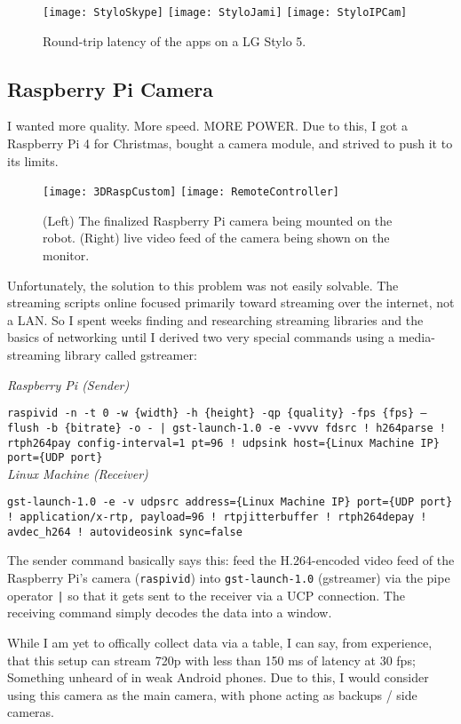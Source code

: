 \begin{figure}[!htb]
    \centering
    \texttt{[image: StyloSkype]}
    \texttt{[image: StyloJami]}
    \texttt{[image: StyloIPCam]}
    \caption{
        Round-trip latency of the apps on a LG Stylo 5.
    }
\end{figure}

\newpage
\subsection{Raspberry Pi Camera}
I wanted more quality. More speed. MORE POWER. Due to this, I got a Raspberry Pi 4 for Christmas, bought a camera module, and strived to push it to its limits.

\begin{figure}[!htb]
    \centering
    \texttt{[image: 3DRaspCustom]}
    \texttt{[image: RemoteController]}
    \caption{
        (Left) The finalized Raspberry Pi camera being mounted on the robot. (Right) live video feed of the camera being shown on the monitor.
    }
\end{figure}

Unfortunately, the solution to this problem was not easily solvable. The streaming scripts online focused primarily toward streaming over the internet, not a LAN. So I spent weeks finding and researching streaming libraries and the basics of networking until I derived two very special commands using a media-streaming library called gstreamer:

\begin{centering}

\textit{Raspberry Pi (Sender)}

\texttt{raspivid -n -t 0 -w \{width\} -h \{height\} -qp \{quality\} -fps \{fps\} --flush -b \{bitrate\} -o - | gst-launch-1.0 -e -vvvv fdsrc ! h264parse ! rtph264pay config-interval=1 pt=96 ! udpsink host=\{Linux Machine IP\} port=\{UDP port\}} \\[1cm]

\textit{Linux Machine (Receiver)}

\texttt{gst-launch-1.0 -e -v udpsrc address=\{Linux Machine IP\} port=\{UDP port\} ! application/x-rtp, payload=96 ! rtpjitterbuffer ! rtph264depay ! avdec\_h264 ! autovideosink sync=false}

\end{centering}

The sender command basically says this: feed the H.264-encoded video feed of the Raspberry Pi's camera (\texttt{raspivid}) into \texttt{gst-launch-1.0} (gstreamer) via the pipe operator \texttt{|} so that it gets sent to the receiver via a UCP connection. The receiving command simply decodes the data into a window.

While I am yet to offically collect data via a table, I can say, from experience, that this setup can stream 720p with less than 150 ms of latency at 30 fps; Something unheard of in weak Android phones. Due to this, I would consider using this camera as the main camera, with phone acting as backups / side cameras.
